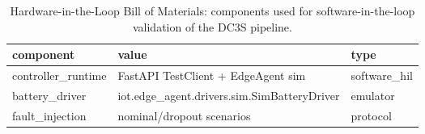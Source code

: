 \begin{table}[htbp]
\centering
\caption{Hardware-in-the-Loop Bill of Materials: components used for software-in-the-loop validation of the DC3S pipeline.}
\label{tab:hil_hardware}
\begin{tabular}{lll}
\toprule
component & value & type \\
\midrule
controller\_runtime & FastAPI TestClient + EdgeAgent sim & software\_hil \\
battery\_driver & iot.edge\_agent.drivers.sim.SimBatteryDriver & emulator \\
fault\_injection & nominal/dropout scenarios & protocol \\
\bottomrule
\end{tabular}
\end{table}
